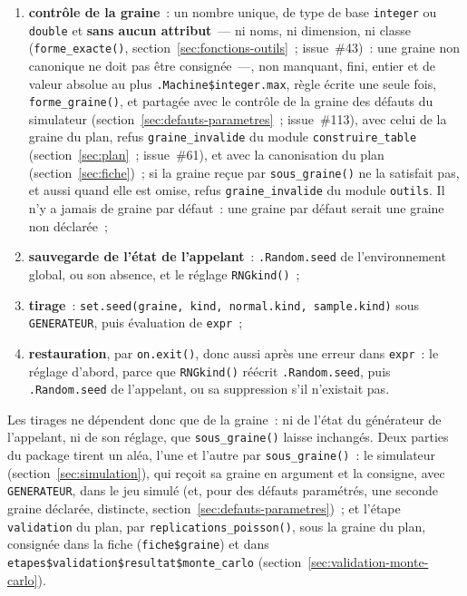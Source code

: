 \documentclass[a4paper,11pt]{article}
\newcommand{\code}[1]{\texttt{\small #1}}
\begin{document}
\begin{enumerate}[leftmargin=*, itemsep=2pt]
  \item \textbf{contrôle de la graine}~: un nombre unique, de type de base
    \code{integer} ou \code{double} et \textbf{sans aucun attribut}~--- ni
    noms, ni dimension, ni classe (\code{forme\_exacte()},
    section~\ref{sec:fonctions-outils}~; issue~\#43)~: une graine non
    canonique ne doit pas être consignée~---, non manquant, fini,
    entier et de valeur absolue au plus \code{.Machine\$integer.max},
    règle écrite une seule fois, \code{forme\_graine()}, et partagée avec le
    contrôle de la graine des défauts du simulateur
    (section~\ref{sec:defauts-parametres}~; issue~\#113), avec celui de la
    graine du plan, refus \code{graine\_invalide} du module
    \code{construire\_table} (section~\ref{sec:plan}~; issue~\#61), et avec
    la canonisation du plan (section~\ref{sec:fiche})~; si la graine reçue
    par \code{sous\_graine()} ne la satisfait pas, et aussi quand elle est
    omise, refus \code{graine\_invalide} du module
    \code{outils}. Il n'y a jamais de graine par défaut~: une graine par défaut
    serait une graine non déclarée~;
  \item \textbf{sauvegarde de l'état de l'appelant}~: \code{.Random.seed} de
    l'environnement global, ou son absence, et le réglage \code{RNGkind()}~;
  \item \textbf{tirage}~: \code{set.seed(graine, kind, normal.kind, sample.kind)}
    sous \code{GENERATEUR}, puis évaluation de \code{expr}~;
  \item \textbf{restauration}, par \code{on.exit()}, donc aussi après une erreur
    dans \code{expr}~: le réglage d'abord, parce que \code{RNGkind()} réécrit
    \code{.Random.seed}, puis \code{.Random.seed} de l'appelant, ou sa
    suppression s'il n'existait pas.
\end{enumerate}

\noindent
Les tirages ne dépendent donc que de la graine~: ni de l'état du générateur
de l'appelant, ni de son réglage, que \code{sous\_graine()} laisse inchangés.
Deux parties du package tirent un aléa, l'une et l'autre par
\code{sous\_graine()}~: le simulateur (section~\ref{sec:simulation}), qui
reçoit sa graine en argument et la consigne, avec \code{GENERATEUR}, dans le
jeu simulé (et, pour des défauts paramétrés, une seconde graine déclarée,
distincte, section~\ref{sec:defauts-parametres})~; et l'étape
\code{validation} du plan, par \code{replications\_poisson()}, sous la
graine du plan, consignée dans la fiche (\code{fiche\$graine}) et dans
\code{etapes\$validation\$resultat\$monte\_carlo}
(section~\ref{sec:validation-monte-carlo}).
\end{document}
